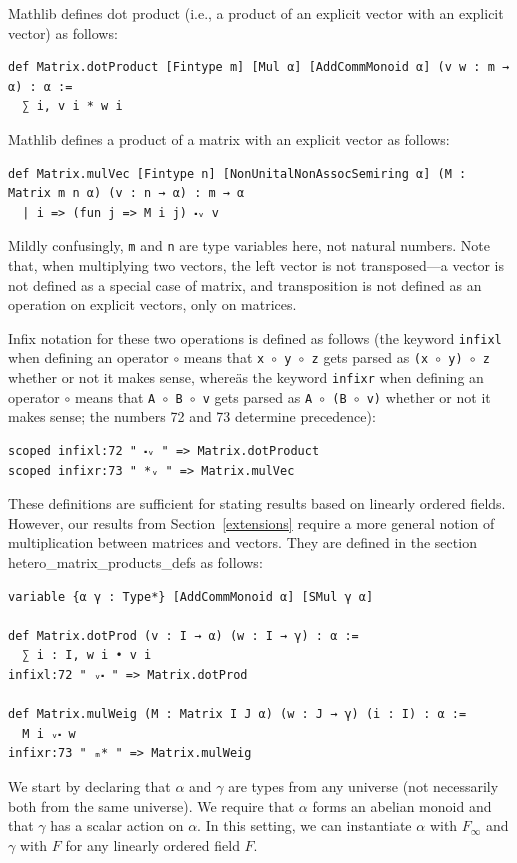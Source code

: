 \documentclass[]{article}
\renewcommand{\.}{\hskip .75pt}
\newcommand{\sekt}[1]{Section~\ref{#1}}
\begin{document}
Mathlib defines dot product (i.e., a product of an explicit vector with an explicit vector) as follows:
\begin{lstlisting}
def Matrix.dotProduct [Fintype m] [Mul α] [AddCommMonoid α] (v w : m → α) : α :=
  ∑ i, v i * w i
\end{lstlisting}
Mathlib defines a product of a matrix with an explicit vector as follows:
\begin{lstlisting}
def Matrix.mulVec [Fintype n] [NonUnitalNonAssocSemiring α] (M : Matrix m n α) (v : n → α) : m → α
  | i => (fun j => M i j) ⬝ᵥ v
\end{lstlisting}
Mildly confusingly, \texttt{m} and \texttt{n} are type variables here, not natural numbers.
Note that, when multiplying two vectors,
the left vector is not transposed\:---\:a vector is not
defined as a special case of matrix, and transposition is not
defined as an operation on explicit vectors, only on matrices.

Infix notation for these two operations is defined as follows
(the keyword \texttt{infixl} when defining an operator $\circ$ means that
\hbox{\texttt{x $\circ$ y $\circ$ z}} gets parsed as \texttt{(x $\circ$ y) $\circ$ z}
whether or not it makes sense, whereäs the keyword \texttt{infixr} when defining an operator $\circ$ means that %
\hbox{\texttt{A $\circ$ B $\circ$ v}} gets parsed as \texttt{A $\circ$ (B $\circ$ v)}
whether or not it makes sense; the numbers 72 and 73 determine precedence):
\begin{lstlisting}
scoped infixl:72 " ⬝ᵥ " => Matrix.dotProduct
scoped infixr:73 " *ᵥ " => Matrix.mulVec
\end{lstlisting}
These definitions are sufficient for stating results based on linearly ordered fields.
However, our results from \sekt{extensions} require a more general notion of
multiplication between matrices and vectors.
They are defined in the section hetero\_matrix\_products\_defs as follows:
\begin{lstlisting}
variable {α γ : Type*} [AddCommMonoid α] [SMul γ α]

def Matrix.dotProd (v : I → α) (w : I → γ) : α :=
  ∑ i : I, w i • v i
infixl:72 " ᵥ⬝ " => Matrix.dotProd

def Matrix.mulWeig (M : Matrix I J α) (w : J → γ) (i : I) : α :=
  M i ᵥ⬝ w
infixr:73 " ₘ* " => Matrix.mulWeig
\end{lstlisting}
We start by declaring that $\alpha$ and $\gamma$ are types from
any universe (not necessarily both from the same universe).
We require that $\alpha$ forms an abelian monoid and that
$\gamma$ has a scalar action on $\alpha$. In this setting,
we can instantiate $\alpha$ with $F_\infty$ and $\gamma$
with $F$ for any linearly ordered field $F$.
\end{document}
